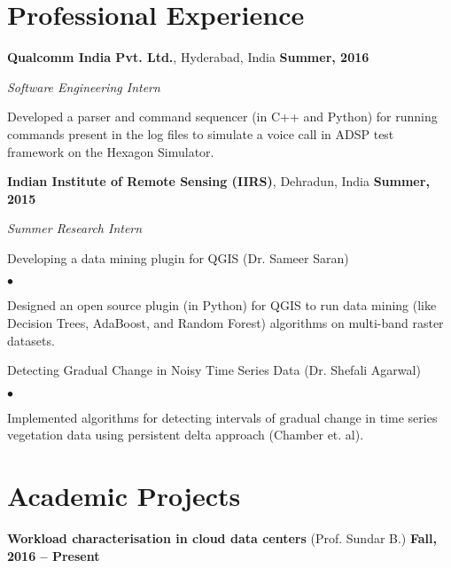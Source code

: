 \documentclass[margin,line]{res}
\newenvironment{list1}{
  \begin{list}{\ding{113}}{%
      \setlength{\itemsep}{0in}
      \setlength{\parsep}{0in} \setlength{\parskip}{0in}
      \setlength{\topsep}{0in} \setlength{\partopsep}{0in} 
      \setlength{\leftmargin}{0.17in}}}{\end{list}}
\newenvironment{list2}{
  \begin{list}{$\bullet$}{%
      \setlength{\itemsep}{0in}
      \setlength{\parsep}{0in} \setlength{\parskip}{0in}
      \setlength{\topsep}{0in} \setlength{\partopsep}{0in} 
      \setlength{\leftmargin}{0.2in}}}{\end{list}}
\begin{document}
\begin{resume}
\section{\sc Professional Experience}
{\bf Qualcomm India Pvt. Ltd.}, Hyderabad, India \hfill {\bf Summer, 2016}

\vspace{-.3cm}
{\em Software Engineering Intern}\\
\vspace*{-.1in}
\begin{list1}
\item[] Developed a parser and command sequencer (in C++ and Python) for running commands present in the log files to simulate a voice call in ADSP test framework on the Hexagon Simulator.
\end{list1}

{\bf Indian Institute of Remote Sensing (IIRS)}, Dehradun, India \hfill {\bf Summer, 2015}

\vspace{-.3cm}
{\em Summer Research Intern}\\
\vspace*{-.1in}
\begin{list1}
\item[] Developing a data mining plugin for QGIS (Dr. Sameer Saran)
\begin{list2}
\vspace*{.05in}
\item Designed an open source plugin (in Python) for QGIS to run data mining (like Decision Trees, AdaBoost, and Random Forest) algorithms on multi-band raster datasets.
\end{list2}
\vspace*{.05in}
\item[] Detecting Gradual Change in Noisy Time Series Data (Dr. Shefali Agarwal)
\begin{list2}
\vspace*{.05in}
\item Implemented algorithms for detecting intervals of gradual change in time series vegetation data using persistent delta approach (Chamber et. al).
\end{list2}
\end{list1}


\section{\sc Academic Projects}

{\bf Workload characterisation in cloud data centers} (Prof. Sundar B.) \hfill {\bf Fall, 2016 -- Present}


\end{resume}
\end{document}
